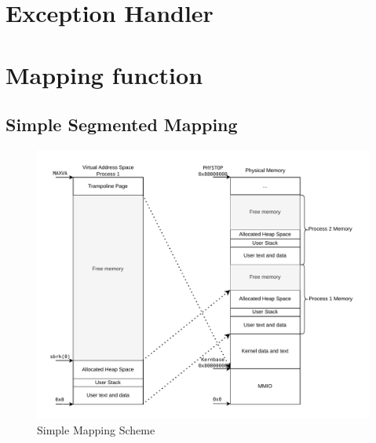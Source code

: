 




\section{Exception Handler}


\section{Mapping function}





\subsection{Simple Segmented Mapping}

\begin{figure}[ht!]
    \centering
    \includegraphics[]{figures/simple_mapping.pdf}

    \caption[Simple Mapping Scheme]{Simple Mapping Scheme}
    \label{fig:theory:simplemapping}
\end{figure}